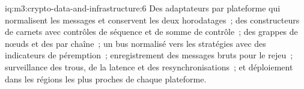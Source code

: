 \begin{solution}{iq:m3:crypto-data-and-infrastructure:6}
Des adaptateurs par plateforme qui normalisent les messages et conservent les deux horodatages~; des constructeurs de carnets avec contrôles de séquence et de somme de contrôle~; des grappes de nœuds et des  par chaîne~; un
bus normalisé vers les stratégies avec des indicateurs de péremption~; enregistrement des messages bruts pour le rejeu~; surveillance des trous, de la latence et des resynchronisations~; et déploiement dans les régions
les plus proches de chaque plateforme.
\end{solution}
